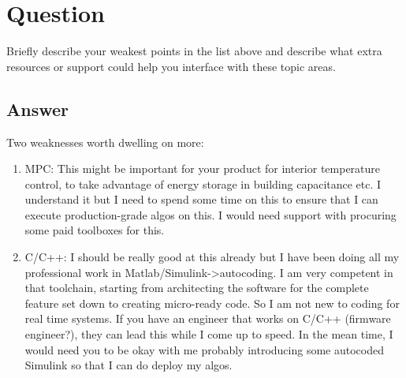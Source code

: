 \section{Question}
Briefly describe your weakest points in the list above and describe what extra resources
or support could help you interface with these topic areas.

\subsection *{Answer}

Two weaknesses worth dwelling on more:
\begin{enumerate}
  \item MPC: This might be important for your product for interior temperature control, to take advantage of energy storage in building capacitance etc. I understand it but I need to spend some time on this to ensure that I can execute production-grade algos on this. I would need support with procuring some paid toolboxes for this.
  \item C/C++: I should be really good at this already but I have been doing all my professional work in Matlab/Simulink->autocoding. I am very competent in that toolchain, starting from architecting the software for the complete feature set down to creating micro-ready code. So I am not new to coding for real time systems. If you have an engineer that works on C/C++ (firmware engineer?), they can lead this while I come up to speed. In the mean time, I would need you to be okay with me probably introducing some autocoded Simulink so that I can do deploy my algos.
\end{enumerate}